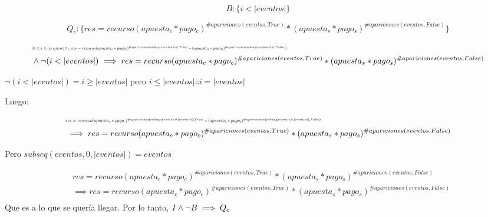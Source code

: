 \documentclass[10pt,a4paper]{article}
\begin{document}
\begin{equation}
    B: \{ i < |eventos|\}
\end{equation}

\begin{equation}
    Q_c: \{ res = recurso(apuesta_c * pago_c)^{\#apariciones(eventos,True)} *(apuesta_s * pago_s)^{\#apariciones(eventos,False)} \}
\end{equation}


\begin{equation}
    \begin{aligned}
        &\resizebox{.9\hsize}{!}{$(0 \leq i \leq |eventos| \yLuego res = recurso(apuesta_c * pago_c)^{\#apariciones(subseq(eventos,0,i),True)} *(apuesta_s * pago_s)^{\#apariciones(subseq(eventos,0,i),False)})$}\\
        & \land \neg (i < |eventos|) \implies res = recurso(apuesta_c * pago_c)^{\#apariciones(eventos,True)} *(apuesta_s * pago_s)^{\#apariciones(eventos,False)}
    \end{aligned}
\end{equation}

$\neg (i < |eventos|) = i \geq |eventos|$ pero $i \leq |eventos| \therefore i = |eventos|$

\vspace{0.3cm}

Luego:

\begin{equation}
    \begin{aligned}
    &\resizebox{.9\hsize}{!}{$res = recurso(apuesta_c * pago_c)^{\#apariciones(subseq(eventos,0,|eventos|),True)} *(apuesta_s * pago_s)^{\#apariciones(subseq(eventos,0,|eventos|),False)}$} \\
    &\implies res = recurso(apuesta_c * pago_c)^{\#apariciones(eventos,True)} *(apuesta_s * pago_s)^{\#apariciones(eventos,False)}
    \end{aligned}
\end{equation}

Pero $subseq(eventos,0,|eventos|) = eventos$

\begin{equation}
    \begin{aligned}
    &res = recurso(apuesta_c * pago_c)^{\#apariciones(eventos,True)} *(apuesta_s * pago_s)^{\#apariciones(eventos,False)} \\
    &\implies res = recurso(apuesta_c * pago_c)^{\#apariciones(eventos,True)} *(apuesta_s * pago_s)^{\#apariciones(eventos,False)} \\
    \end{aligned}
\end{equation}
Que es a lo que se quería llegar. Por lo tanto, ${\it I} \land \neg B \implies Q_c$ \\
\end{document}

